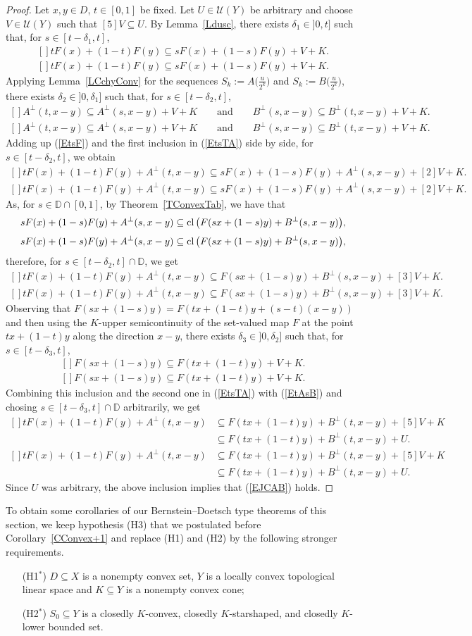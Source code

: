 \documentclass[12pt,reqno]{amsart}
\newcommand{\D}{\mathbb{D}}
\newcommand{\U}{\mathscr{U}}
\newcommand{\cl}{\mathop{\hbox{\rm cl}}\nolimits}
\def\thm#1{Theorem~\ref{T#1}}
\def\cor#1{Corollary~\ref{C#1}}
\def\lem#1{Lemma~\ref{L#1}}
\theoremstyle{definition}
\def\eq#1{{\rm(\ref{E#1})}}
\def\Eq#1#2{\ifthenelse{\equal{#1}{*}}
  {\begin{equation*}\begin{aligned}[]#2\end{aligned}\end{equation*}}
  {\begin{equation}\begin{aligned}[]\label{E#1}#2\end{aligned}\end{equation}}}
\begin{document}
\begin{proof}
Let $x,y\in D$, $t\in[0,1]$ be fixed. Let $U\in\U(Y)$ be arbitrary and choose $V\in\U(Y)$ such that 
$[5]V\subseteq U$. By \lem{dusc}, there exists $\delta_1\in]0,t]$ such that, for $s\in[t-\delta_1,t]$,
\Eq{tsF}{
tF(x) + (1-t)F(y)\subseteq sF(x)+(1-s)F(y) + V + K.
}
Applying \lem{CchyConv} for the sequences $S_k:=A\big(\frac{u}{2^k}\big)$ and $S_k:=B\big(\frac{u}{2^k}\big)$, 
there exists $\delta_2\in]0,\delta_1]$ such that, for $s\in[t-\delta_2,t]$,
\Eq{tsTA}{
  A^\perp(t,x-y)\subseteq A^\perp(s,x-y)+V+K \qquad\mbox{and}\qquad B^\perp(s,x-y)\subseteq B^\perp(t,x-y)+V+K.
}
Adding up \eq{tsF} and the first inclusion in \eq{tsTA} side by side, for $s\in[t-\delta_2,t]$, we obtain
\Eq{*}{
  tF(x) + (1-t)F(y) + A^\perp(t,x-y) \subseteq sF(x)+(1-s)F(y) + A^\perp(s,x-y)+[2]V+K.
}
As, for $s\in\D\cap[0,1]$, by \thm{ConvexTab}, we have that 
\Eq{*}{
sF(x)+(1-s)F(y)+A^\perp(s,x-y) \subseteq \cl\big(F(sx+(1-s)y)+B^\perp(s,x-y)\big),
}
therefore, for $s\in[t-\delta_2,t]\cap\D$, we get
\Eq{tAsB}{
tF(x) + (1-t)F(y) + A^\perp(t,x-y) \subseteq F(sx+(1-s)y) + B^\perp(s,x-y)+[3]V+K.
}
Observing that $F(sx+(1-s)y)=F(tx+(1-t)y+(s-t)(x-y))$ and then using the  $K$-upper semicontinuity of the set-valued map 
$F$ at the point $tx+(1-t)y$ along the direction $x-y$, there exists $\delta_3\in]0,\delta_2]$ such that, for 
$s\in[t-\delta_3,t]$,
\Eq{FKuhc}{
F(sx+(1-s)y)\subseteq F(tx+(1-t)y) + V+K.
}
Combining this inclusion and the second one in \eq{tsTA} with \eq{tAsB} and chosing $s\in[t-\delta_3,t]\cap\D$ 
arbitrarily, we get
\Eq{*}{
  tF(x) + (1-t)F(y) + A^\perp(t,x-y) 
  &\subseteq F(tx+(1-t)y) + B^\perp(t,x-y)+[5]V+K \\
  &\subseteq F(tx+(1-t)y) + B^\perp(t,x-y)+U.
}
Since $U$ was arbitrary, the above inclusion implies that \eq{JCAB} holds.
\end{proof}

To obtain some corollaries of our Bernstein--Doetsch type theorems of this section, we keep hypothesis (H3) 
that we postulated before \cor{Convex+1} and replace (H1) and (H2) by the following stronger requirements.
\begin{enumerate}
\item[(H1$^*$)] $D\subseteq X$ is a nonempty convex set, $Y$ is a locally convex topological linear space and 
$K\subseteq Y$ is a nonempty convex cone; 
\item[(H2$^*$)] $S_0\subseteq Y$ is a closedly $K$-convex, closedly $K$-starshaped, and closedly $K$-lower bounded 
set.
\end{enumerate}
\end{document}
